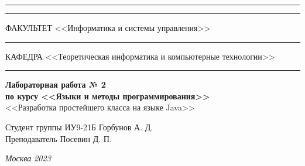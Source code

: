 \documentclass[a4paper, 14pt]{extarticle}
\begin{document}
\begin{titlepage}
\vspace{-25pt}
\hspace{-35pt}\rule{\textwidth}{2.3pt}

\vspace*{-20.3pt}
\hspace{-35pt}\rule{\textwidth}{0.4pt}

\vspace{1.5ex}
\hspace{-35pt} \noindent \small ФАКУЛЬТЕТ\hspace{80pt} <<Информатика и системы управления>>

\vspace*{-16pt}
\hspace{47pt}\rule{0.83\textwidth}{0.4pt}

\vspace{0.5ex}
\hspace{-35pt} \noindent \small КАФЕДРА\hspace{50pt} <<Теоретическая информатика и компьютерные технологии>>

\vspace*{-16pt}
\hspace{30pt}\rule{0.866\textwidth}{0.4pt}
  
\vspace{11em}

\begin{center}
\Large {\bf Лабораторная работа № 2} \\ 
\large {\bf по курсу <<Языки и методы программирования>>} \\
\large <<Разработка простейшего класса на языке Java>> 
\end{center}\normalsize

\vspace{8em}


\begin{flushright}
  {Студент группы ИУ9-21Б Горбунов А. Д. \hspace*{15pt}\\ 
  \vspace{2ex}
  Преподаватель Посевин Д. П.\hspace*{15pt}}
\end{flushright}

\bigskip

\vfill
 

\begin{center}
\textsl{Москва 2023}
\end{center}
\end{titlepage}
\end{document}

